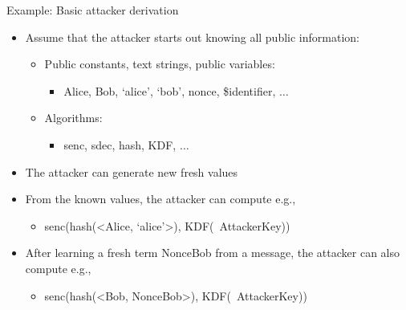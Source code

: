 \documentclass[11pt,aspectratio=169]{beamer}
\begin{document}
\begin{frame}[fragile]{Example: Basic attacker derivation}
    \begin{itemize}
        \item Assume that the attacker starts out knowing all public 
              information:
        \begin{itemize}
            \item Public constants, text strings, public variables:
            \begin{itemize}
                \item \textcolor{TermBlue}{Alice, Bob, `alice', `bob',
                      \tildelow{}nonce, \$identifier, $\dots$}
            \end{itemize}
            \item Algorithms:
            \begin{itemize}
                \item \textcolor{TermBlue}{senc, sdec, hash, KDF, $\dots$}
            \end{itemize}
        \end{itemize}
        \item The attacker can generate new fresh values
        \item From the known values, the attacker can compute e.g.,
        \begin{itemize}
            \item \textcolor{TermBlue}{
                senc(hash(<Alice, `alice'>), KDF(~AttackerKey))}
        \end{itemize}
        \item After learning a fresh term \textcolor{TermBlue}{NonceBob} from a 
              message, the attacker can also compute e.g.,
        \begin{itemize}
            \item \textcolor{TermBlue}{
                senc(hash(<Bob, NonceBob>), KDF(~AttackerKey))}
        \end{itemize}
    \end{itemize}
\end{frame}
\end{document}
